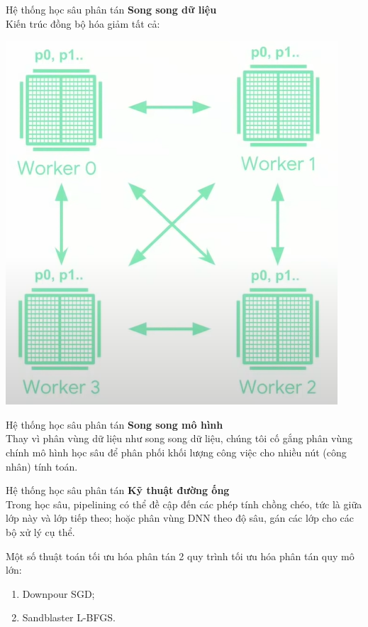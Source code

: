 \documentclass[notheorems,hyperref={bookmarks=true}]{beamer}
\theoremstyle{plain}
\numberwithin{equation}{section}
\begin{document}
\begin{footnotesize}
\begin{frame}{Hệ thống học sâu phân tán}
\textbf{Song song dữ liệu } \\
Kiến trúc đồng bộ hóa giảm tất cả:
\begin{center}
\includegraphics[scale=0.55]{sync.PNG}
\end{center}
\end{frame}


\begin{frame}{Hệ thống học sâu phân tán}
\textbf{Song song mô hình } \\
Thay vì phân vùng dữ liệu như song song dữ liệu, chúng tôi cố gắng phân vùng chính mô hình học sâu để phân phối khối lượng công việc cho nhiều nút (công nhân) tính toán.
\end{frame}

\begin{frame}{Hệ thống học sâu phân tán}
\textbf{Kỹ thuật đường ống } \\
Trong học sâu, pipelining có thể đề cập đến các phép tính chồng chéo, tức là giữa lớp này và lớp tiếp theo; hoặc phân vùng DNN theo độ sâu, gán các lớp cho các bộ xử lý cụ thể.
\end{frame}

\begin{frame}{Một số thuật toán tối ưu hóa phân tán}
2 quy trình tối ưu hóa phân tán quy mô lớn:\\
\begin{enumerate}[i]
	\item Downpour SGD;
	\item Sandblaster L-BFGS.
\end{enumerate}
\end{frame}


\end{footnotesize}
\end{document}

